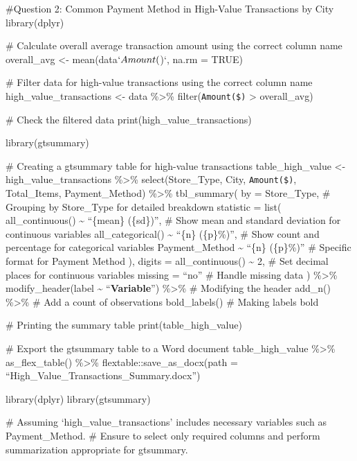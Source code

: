 \documentclass[
]{article}
\begin{document}
\#Question 2: Common Payment Method in High-Value Transactions by City
library(dplyr)

\# Calculate overall average transaction amount using the correct column
name overall\_avg \textless- mean(data\(`Amount(\))`, na.rm = TRUE)

\# Filter data for high-value transactions using the correct column name
high\_value\_transactions \textless- data \%\textgreater\%
filter(\texttt{Amount(\$)} \textgreater{} overall\_avg)

\# Check the filtered data print(high\_value\_transactions)

library(gtsummary)

\# Creating a gtsummary table for high-value transactions
table\_high\_value \textless- high\_value\_transactions \%\textgreater\%
select(Store\_Type, City, \texttt{Amount(\$)}, Total\_Items,
Payment\_Method) \%\textgreater\% tbl\_summary( by = Store\_Type, \#
Grouping by Store\_Type for detailed breakdown statistic = list(
all\_continuous() \textasciitilde{} ``\{mean\} (\{sd\})'', \# Show mean
and standard deviation for continuous variables all\_categorical()
\textasciitilde{} ``\{n\} (\{p\}\%)'', \# Show count and percentage for
categorical variables Payment\_Method \textasciitilde{} ``\{n\}
(\{p\}\%)'' \# Specific format for Payment Method ), digits =
all\_continuous() \textasciitilde{} 2, \# Set decimal places for
continuous variables missing = ``no'' \# Handle missing data )
\%\textgreater\% modify\_header(label \textasciitilde{}
``\textbf{Variable}'') \%\textgreater\% \# Modifying the header add\_n()
\%\textgreater\% \# Add a count of observations bold\_labels() \# Making
labels bold

\# Printing the summary table print(table\_high\_value)

\# Export the gtsummary table to a Word document table\_high\_value
\%\textgreater\% as\_flex\_table() \%\textgreater\%
flextable::save\_as\_docx(path =
``High\_Value\_Transactions\_Summary.docx'')

library(dplyr) library(gtsummary)

\# Assuming `high\_value\_transactions' includes necessary variables
such as Payment\_Method. \# Ensure to select only required columns and
perform summarization appropriate for gtsummary.
\end{document}
